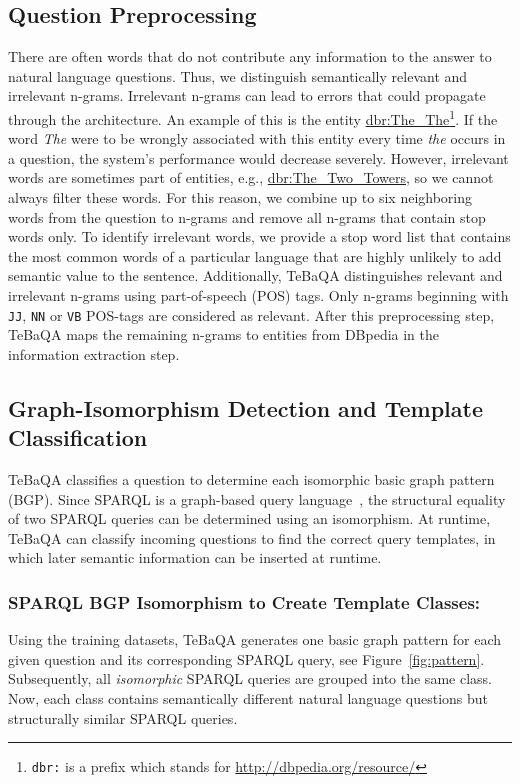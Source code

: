 \documentclass{IOS-Book-Article}
\begin{document}
\subsection{Question Preprocessing}\label{Linguistic-Pruning}

There are often words that do not contribute any information to the answer to natural language questions.
Thus, we distinguish semantically relevant and irrelevant n-grams.
Irrelevant n-grams can lead to errors that could propagate through the architecture.
An example of this is the entity \url{dbr:The_The}\footnote{\texttt{dbr:} is a prefix which stands for \url{http://dbpedia.org/resource/}}. If the word \textit{The} were to be wrongly associated with this entity every time \textit{the} occurs in a question, the system's performance would decrease severely.
However, irrelevant words are sometimes part of entities, e.g., \url{dbr:The_Two_Towers}, so we cannot always filter these words.
For this reason, we combine up to six neighboring words from the question to n-grams and remove all n-grams that contain stop words only.
To identify irrelevant words, we provide a stop word list that contains the most common words of a particular language that are highly unlikely to add semantic value to the sentence. 
Additionally, TeBaQA distinguishes relevant and irrelevant n-grams using part-of-speech (POS) tags. Only n-grams beginning with \lstinline|JJ|, \lstinline|NN| or \lstinline|VB| POS-tags are considered as relevant. 
After this preprocessing step, TeBaQA maps the remaining n-grams to entities from DBpedia in the information extraction step.

\subsection{Graph-Isomorphism Detection and Template Classification}
TeBaQA classifies a question to determine each isomorphic basic graph pattern (BGP).
Since SPARQL is a graph-based query language~\cite{Perez:2009:SCS:1567274.1567278}, the structural equality of two SPARQL queries can be determined using an isomorphism. 
At runtime, TeBaQA can classify incoming questions to find the correct query templates, in which later semantic information can be inserted at runtime.

\subsubsection{SPARQL BGP Isomorphism to Create Template Classes:}
Using the training datasets, TeBaQA generates one basic graph pattern for each given question and its corresponding SPARQL query, see Figure~\ref{fig:pattern}.
Subsequently, all \textit{isomorphic} SPARQL queries are grouped into the same class. 
Now, each class contains semantically different natural language questions but structurally similar SPARQL queries.
\end{document}
